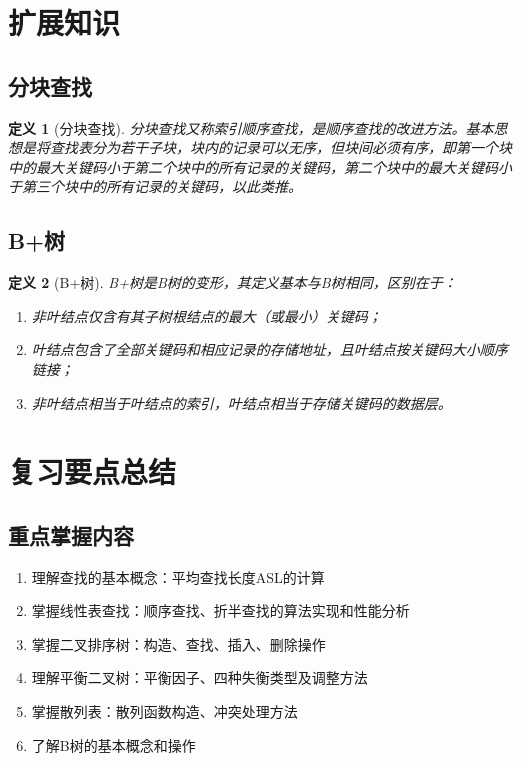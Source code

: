 \documentclass[12pt,a4paper]{amsart}
\newtheorem{definition}{定义}[section]
\begin{document}
\section{扩展知识}

\subsection{分块查找}

\begin{definition}[分块查找]
分块查找又称索引顺序查找，是顺序查找的改进方法。基本思想是将查找表分为若干子块，块内的记录可以无序，但块间必须有序，即第一个块中的最大关键码小于第二个块中的所有记录的关键码，第二个块中的最大关键码小于第三个块中的所有记录的关键码，以此类推。
\end{definition}

\subsection{B+树}

\begin{definition}[B+树]
B+树是B树的变形，其定义基本与B树相同，区别在于：
\begin{enumerate}
\item 非叶结点仅含有其子树根结点的最大（或最小）关键码；
\item 叶结点包含了全部关键码和相应记录的存储地址，且叶结点按关键码大小顺序链接；
\item 非叶结点相当于叶结点的索引，叶结点相当于存储关键码的数据层。
\end{enumerate}
\end{definition}

\section{复习要点总结}

\subsection{重点掌握内容}
\begin{enumerate}
\item 理解查找的基本概念：平均查找长度ASL的计算
\item 掌握线性表查找：顺序查找、折半查找的算法实现和性能分析
\item 掌握二叉排序树：构造、查找、插入、删除操作
\item 理解平衡二叉树：平衡因子、四种失衡类型及调整方法
\item 掌握散列表：散列函数构造、冲突处理方法
\item 了解B树的基本概念和操作
\end{enumerate}
\end{document}

